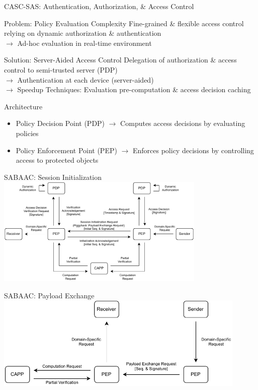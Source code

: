 \documentclass[en]{sdqbeamer}
\begin{document}
\begin{frame}{CASC-SAS: Authentication, Authorization, \& Access Control}
    \begin{redblock}{Problem: Policy Evaluation Complexity}
        Fine-grained \& flexible access control relying on dynamic authorization \& authentication
        \\$\rightarrow$ Ad-hoc evaluation in real-time environment
    \end{redblock}

    \begin{greenblock}{Solution: Server-Aided Access Control}
        Delegation of authorization \& access control to semi-trusted server (PDP)
        \\$\rightarrow$ Authentication at each device (server-aided)
        \\$\rightarrow$ Speedup Techniques: Evaluation pre-computation \& access decision caching
    \end{greenblock}

    \begin{grayblock}{Architecture \parencite{Hu2014,Oasis2013}}
        \begin{itemize}
            \item Policy Decision Point (PDP) $\rightarrow$ Computes access decisions by evaluating policies
            \item Policy Enforcement Point (PEP) $\rightarrow$ Enforces policy decisions by controlling access to protected objects
        \end{itemize}
    \end{grayblock}
\end{frame}
\begin{frame}{SABAAC: Session Initialization}
    \centering
    \includegraphics[width=0.75\textwidth]{./figures/SABAAC_protocols_accesscontrol_initialization.drawio.pdf}
\end{frame}
\begin{frame}{SABAAC: Payload Exchange}
    \centering
    \includegraphics[width=0.9\textwidth]{./figures/SABAAC_protocols_accesscontrol_payloadexchange.drawio.pdf}
\end{frame}
\end{document}
